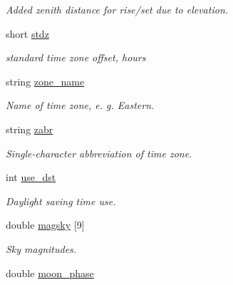 \begin{DoxyCompactItemize}
\begin{DoxyCompactList}\small\item\em Added zenith distance for rise/set due to elevation. \end{DoxyCompactList}\item 
\hypertarget{class_observatory_a079452085f0d8f7ae727a69973fca866}{short \hyperlink{class_observatory_a079452085f0d8f7ae727a69973fca866}{stdz}}\label{class_observatory_a079452085f0d8f7ae727a69973fca866}

\begin{DoxyCompactList}\small\item\em standard time zone offset, hours \end{DoxyCompactList}\item 
\hypertarget{class_observatory_a25a20e3ee29ae7a493d4a96713333df0}{string \hyperlink{class_observatory_a25a20e3ee29ae7a493d4a96713333df0}{zone\-\_\-name}}\label{class_observatory_a25a20e3ee29ae7a493d4a96713333df0}

\begin{DoxyCompactList}\small\item\em Name of time zone, e. g. Eastern. \end{DoxyCompactList}\item 
\hypertarget{class_observatory_a19e0f8f209803d6df0d7ac3621da9e5d}{string \hyperlink{class_observatory_a19e0f8f209803d6df0d7ac3621da9e5d}{zabr}}\label{class_observatory_a19e0f8f209803d6df0d7ac3621da9e5d}

\begin{DoxyCompactList}\small\item\em Single-\/character abbreviation of time zone. \end{DoxyCompactList}\item 
int \hyperlink{class_observatory_a98979301df0236da8fa1fbb857ef6ee6}{use\-\_\-dst}
\begin{DoxyCompactList}\small\item\em Daylight saving time use. \end{DoxyCompactList}\item 
double \hyperlink{class_observatory_a6e5da8fe4abb0590322d435eeb557758}{magsky} \mbox{[}9\mbox{]}
\begin{DoxyCompactList}\small\item\em Sky magnitudes. \end{DoxyCompactList}\item 
\hypertarget{class_observatory_acd64fa9d3020f86a1148ea4c2b3b64e4}{double \hyperlink{class_observatory_acd64fa9d3020f86a1148ea4c2b3b64e4}{moon\-\_\-phase}}\label{class_observatory_acd64fa9d3020f86a1148ea4c2b3b64e4}


\end{DoxyCompactItemize}
